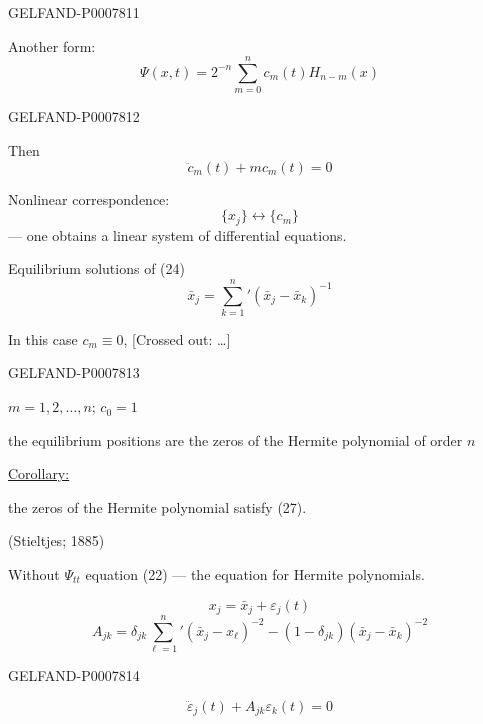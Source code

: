 \begin{GelfandAdjacentEvidence}{GELFAND-P000781}{1}

Another form:
\begin{equation}
\Psi(x,t)=2^{-n}\sum_{m=0}^n c_m(t)H_{n-m}(x)\tag{25}
\end{equation}
\end{GelfandAdjacentEvidence}
\begin{GelfandAdjacentEvidence}{GELFAND-P000781}{2}


Then
\begin{equation}
\ddot c_m(t)+mc_m(t)=0\tag{26}
\end{equation}

Nonlinear correspondence:
\[
\{x_j\}\leftrightarrow\{c_m\}
\]
 --- one obtains a linear system of differential equations.

Equilibrium solutions of (24)
\begin{equation}
\bar x_j=\sum_{k=1}^n{}'(\bar x_j-\bar x_k)^{-1}\tag{27}
\end{equation}

In this case \(c_m\equiv0\),
[Crossed out: …]
\end{GelfandAdjacentEvidence}
\begin{GelfandAdjacentEvidence}{GELFAND-P000781}{3}

\(m=1,2,\ldots,n\); \(c_0=1\)

the equilibrium positions are the zeros of the Hermite polynomial of order \(n\)

\underline{Corollary:}

the zeros of the Hermite polynomial satisfy (27).

(Stieltjes; 1885)

Without \(\Psi_{tt}\) equation (22) --- the equation for Hermite polynomials.

\begin{equation}
x_j=\bar x_j+\varepsilon_j(t)\tag{28}
\end{equation}
\[
A_{jk}=\delta_{jk}\sum_{\ell=1}^n{}'
(\bar x_j-x_\ell)^{-2}
-(1-\delta_{jk})(\bar x_j-\bar x_k)^{-2}
\]
\end{GelfandAdjacentEvidence}
\begin{GelfandAdjacentEvidence}{GELFAND-P000781}{4}

\[
\ddot\varepsilon_j(t)+A_{jk}\varepsilon_k(t)=0
\]
\end{GelfandAdjacentEvidence}


